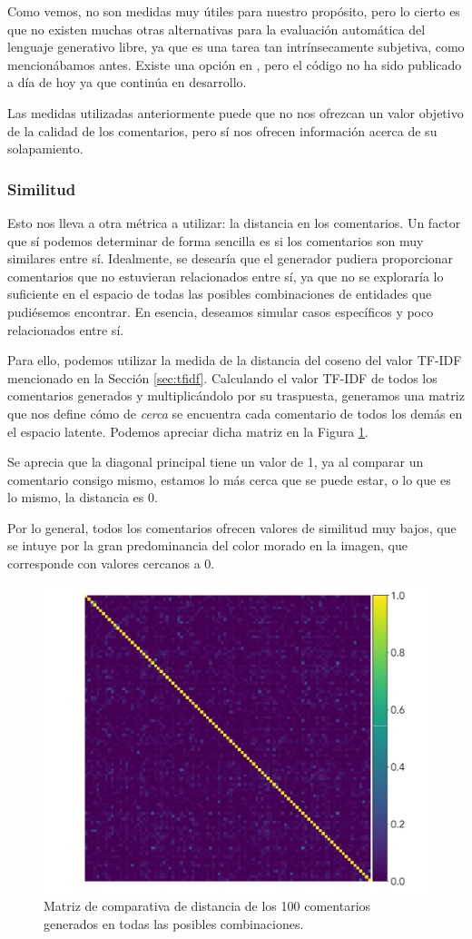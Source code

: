 \vspace{15mm}
Como vemos, no son medidas muy útiles para nuestro propósito, pero lo cierto es que no existen muchas otras alternativas para la evaluación automática del lenguaje generativo libre, ya que es una tarea tan intrínsecamente subjetiva, como mencionábamos antes. Existe una opción en \cite{yuan2021bartscore}, pero el código no ha sido publicado a día de hoy ya que continúa en desarrollo. 

Las medidas utilizadas anteriormente puede que no nos ofrezcan un valor objetivo de la calidad de los comentarios, pero sí nos ofrecen información acerca de su solapamiento.

\subsubsection{Similitud}
Esto nos lleva a otra métrica a utilizar: la distancia en los comentarios. Un factor que sí podemos determinar de forma sencilla es si los comentarios son muy similares entre sí. Idealmente, se desearía que el generador pudiera proporcionar comentarios que no estuvieran relacionados entre sí, ya que no se exploraría lo suficiente en el espacio de todas las posibles combinaciones de entidades que pudiésemos encontrar. En esencia, deseamos simular casos específicos y poco relacionados entre sí.

Para ello, podemos utilizar la medida de la distancia del coseno del valor TF-IDF mencionado en la  Sección \ref{sec:tfidf}. Calculando el valor TF-IDF de todos los comentarios generados y multiplicándolo por su traspuesta, generamos una matriz que nos define cómo de \textit{cerca} se encuentra cada comentario de todos los demás en el espacio latente. Podemos apreciar dicha matriz en la Figura \ref{fig:conf-tfidf}.

Se aprecia que la diagonal principal tiene un valor de 1, ya al comparar un comentario consigo mismo, estamos lo más cerca que se puede estar, o lo que es lo mismo, la distancia es 0.

Por lo general, todos los comentarios ofrecen valores de similitud muy bajos, que se intuye por la gran predominancia del color morado en la imagen, que corresponde con valores cercanos a 0.

\begin{figure}[h]
	\centering
	\includegraphics[width=.6\textwidth]{media/conf_matrix_tfidf.pdf}
	\caption{Matriz de comparativa de distancia de los 100 comentarios generados en todas las posibles combinaciones.}
	\label{fig:conf-tfidf}
\end{figure}



